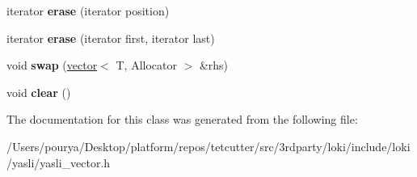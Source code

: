 \begin{DoxyCompactItemize}
\item 
\hypertarget{classyasli_1_1vector_a32ab0a5d33e6dd5b95fb62c1a327447b}{}iterator {\bfseries erase} (iterator position)\label{classyasli_1_1vector_a32ab0a5d33e6dd5b95fb62c1a327447b}

\item 
\hypertarget{classyasli_1_1vector_aa71a3d8ec93fc5839f24b70058c4c553}{}iterator {\bfseries erase} (iterator first, iterator last)\label{classyasli_1_1vector_aa71a3d8ec93fc5839f24b70058c4c553}

\item 
\hypertarget{classyasli_1_1vector_a2c9cf5d53a31595605972e46ed4a874a}{}void {\bfseries swap} (\hyperlink{classyasli_1_1vector}{vector}$<$ T, Allocator $>$ \&rhs)\label{classyasli_1_1vector_a2c9cf5d53a31595605972e46ed4a874a}

\item 
\hypertarget{classyasli_1_1vector_abc54aec9e005fda23989a6dc24eac894}{}void {\bfseries clear} ()\label{classyasli_1_1vector_abc54aec9e005fda23989a6dc24eac894}

\end{DoxyCompactItemize}


The documentation for this class was generated from the following file\+:\begin{DoxyCompactItemize}
\item 
/\+Users/pourya/\+Desktop/platform/repos/tetcutter/src/3rdparty/loki/include/loki/yasli/yasli\+\_\+vector.\+h\end{DoxyCompactItemize}

